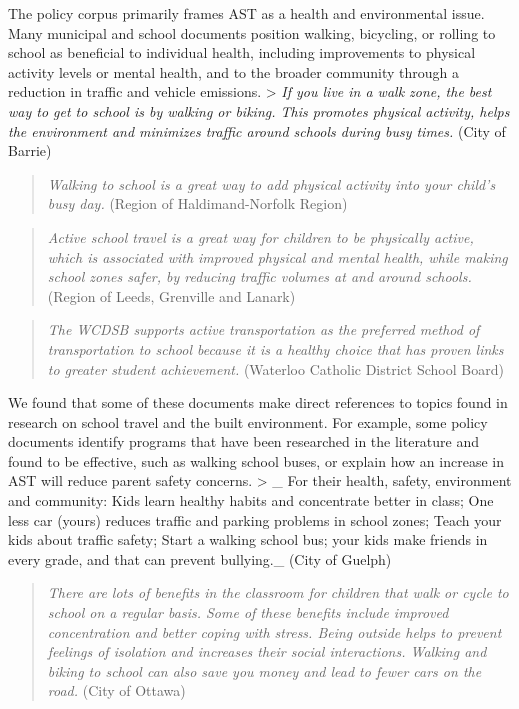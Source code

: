 \documentclass[]{elsarticle} %
\begin{document}
The policy corpus primarily frames AST as a health and environmental
issue. Many municipal and school documents position walking, bicycling,
or rolling to school as beneficial to individual health, including
improvements to physical activity levels or mental health, and to the
broader community through a reduction in traffic and vehicle emissions.
\textgreater{} \emph{If you live in a walk zone, the best way to get to
school is by walking or biking. This promotes physical activity, helps
the environment and minimizes traffic around schools during busy times.}
(City of Barrie)

\begin{quote}
\emph{Walking to school is a great way to add physical activity into
your child's busy day.} (Region of Haldimand-Norfolk Region)
\end{quote}

\begin{quote}
\emph{Active school travel is a great way for children to be physically
active, which is associated with improved physical and mental health,
while making school zones safer, by reducing traffic volumes at and
around schools.}(Region of Leeds, Grenville and Lanark)
\end{quote}

\begin{quote}
\emph{The WCDSB supports active transportation as the preferred method
of transportation to school because it is a healthy choice that has
proven links to greater student achievement.} (Waterloo Catholic
District School Board)
\end{quote}

We found that some of these documents make direct references to topics
found in research on school travel and the built environment. For
example, some policy documents identify programs that have been
researched in the literature and found to be effective, such as walking
school buses, or explain how an increase in AST will reduce parent
safety concerns. \textgreater{} \_ For their health, safety, environment
and community: Kids learn healthy habits and concentrate better in
class; One less car (yours) reduces traffic and parking problems in
school zones; Teach your kids about traffic safety; Start a walking
school bus; your kids make friends in every grade, and that can prevent
bullying.\_ (City of Guelph)

\begin{quote}
\emph{There are lots of benefits in the classroom for children that walk
or cycle to school on a regular basis. Some of these benefits include
improved concentration and better coping with stress. Being outside
helps to prevent feelings of isolation and increases their social
interactions. Walking and biking to school can also save you money and
lead to fewer cars on the road.} (City of Ottawa)
\end{quote}
\end{document}
